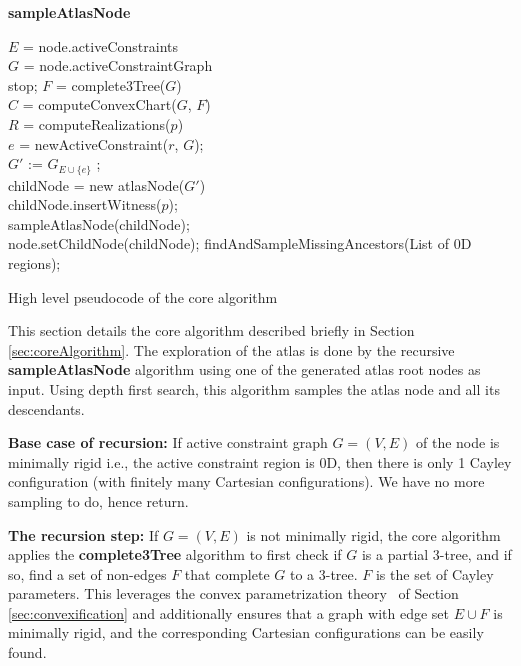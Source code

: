 \documentclass[]{article}
\begin{document}
\begin{algorithm} [htbp]
 {\bf sampleAtlasNode}\\
 \BlankLine

	$E$ = node.activeConstraints\\
	$G$ = node.activeConstraintGraph\\
		{stop;	}
	$F$ = complete3Tree($G$)\\
	
	$C$ = computeConvexChart($G$, $F$)\\

	{
		$R$ = computeRealizations($p$)\\

		{
			{
				{
					$e$ = newActiveConstraint($r$, $G$);\\
					$G'$ := $G_{E \cup \{e\}}$ ;\\
					{
						childNode = new atlasNode($G'$)\\
						childNode.insertWitness($p$);\\
						sampleAtlasNode(childNode);\\
					} 
					node.setChildNode(childNode);
				} 
			}
		}
	}
		findAndSampleMissingAncestors(List of 0D regions);
\caption{High level pseudocode of the core algorithm}
\label{alg:sampleAtlasNode}
\end{algorithm}
This section details the core algorithm described briefly in Section
\ref{sec:coreAlgorithm}.  The exploration of the atlas is done by the recursive
\textbf{sampleAtlasNode} algorithm using one of the generated atlas root nodes
as input. Using depth first search, this algorithm samples the atlas node and
all its descendants. 


\noindent\textbf{Base case of recursion:} If active constraint graph $G = (V, E)$ of
the node is minimally rigid i.e., the active constraint region is 0D, then
there is only 1 Cayley configuration (with finitely many Cartesian
configurations).  We have no more sampling to do, hence return.

\noindent\textbf{The recursion step:} If $G = (V, E)$ is not minimally rigid, the
core algorithm applies the \textbf{complete3Tree} algorithm  
to first check if $G$ is a partial 3-tree, and if so, find a set of non-edges $F$ that complete $G$ to a 3-tree.
$F$ is the set of Cayley parameters.
This leverages the convex parametrization theory~\cite{SiGa:2010} of Section
\ref{sec:convexification} and additionally ensures that a graph with edge set $E \cup F$
is minimally rigid, and the corresponding Cartesian configurations can be easily found. 
\end{document}
